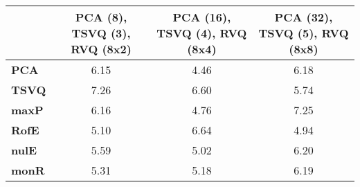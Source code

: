 \begin{tabular}{|l|c|c|c|}
\hline
&\textbf{PCA (8), TSVQ (3), RVQ (8x2)}&\textbf{PCA (16), TSVQ (4), RVQ (8x4)}&\textbf{PCA (32), TSVQ (5), RVQ (8x8)}\\\hline
\textbf{PCA}&6.15&4.46&6.18\\\hline
\textbf{TSVQ}&7.26&6.60&5.74\\\hline
\textbf{maxP}&6.16&4.76&7.25\\\hline
\textbf{RofE}&5.10&6.64&4.94\\\hline
\textbf{nulE}&5.59&5.02&6.20\\\hline
\textbf{monR}&5.31&5.18&6.19\\\hline
\end{tabular}

